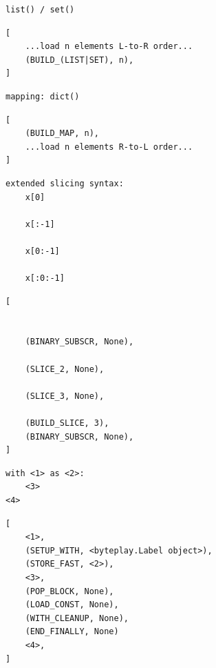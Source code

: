 \documentclass{icldt}
\numberwithin{equation}{section}       %
\begin{document}
{{\newsavebox\eightleft
\begin{lrbox}{\eightleft}
\begin{lstlisting}
list() / set()
\end{lstlisting}
\end{lrbox}
\newsavebox\eightright
\begin{lrbox}{\eightright}
\begin{lstlisting}
[
	...load n elements L-to-R order...
	(BUILD_(LIST|SET), n),
]
\end{lstlisting}
\end{lrbox}

\newsavebox\nineleft
\begin{lrbox}{\nineleft}
\begin{lstlisting}
mapping: dict()
\end{lstlisting}
\end{lrbox}
\newsavebox\nineright
\begin{lrbox}{\nineright}
\begin{lstlisting}
[
	(BUILD_MAP, n),
	...load n elements R-to-L order...
]
\end{lstlisting}
\end{lrbox}

\newsavebox\tenleft
\begin{lrbox}{\tenleft}
\begin{lstlisting}
extended slicing syntax:
	x[0]

	x[:-1]

	x[0:-1]

	x[:0:-1]
\end{lstlisting}
\end{lrbox}
\newsavebox\tenright
\begin{lrbox}{\tenright}
\begin{lstlisting}
[


	(BINARY_SUBSCR, None),
	
	(SLICE_2, None),
	
	(SLICE_3, None),	

	(BUILD_SLICE, 3),
	(BINARY_SUBSCR, None),
]
\end{lstlisting}
\end{lrbox}

\newsavebox\elevenleft
\begin{lrbox}{\elevenleft}
\begin{lstlisting}
with <1> as <2>:
	<3>
<4>
\end{lstlisting}
\end{lrbox}
\newsavebox\elevenright
\begin{lrbox}{\elevenright}
\begin{lstlisting}
[
	<1>,
	(SETUP_WITH, <byteplay.Label object>),
	(STORE_FAST, <2>),
	<3>,
	(POP_BLOCK, None),
	(LOAD_CONST, None),
	(WITH_CLEANUP, None),
	(END_FINALLY, None)
	<4>,
]
\end{lstlisting}
\end{lrbox}

}}
\end{document}
